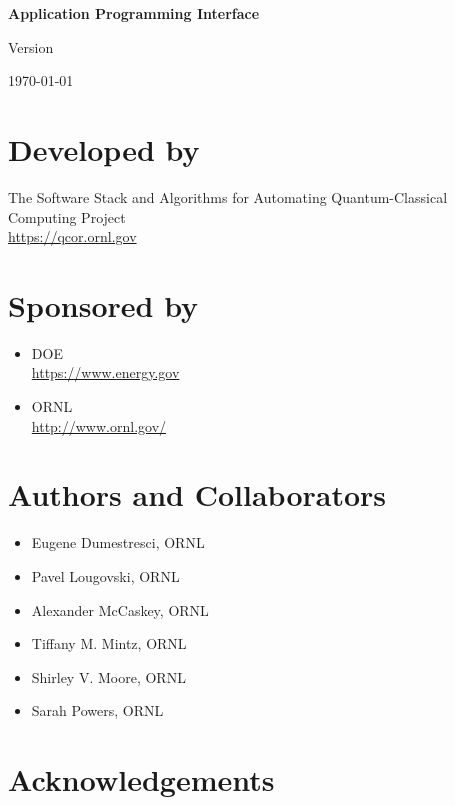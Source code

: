 \thispagestyle{empty}
\begin{center}
\textbf{\Huge \qcor}
\par
\end{center}
\begin{center}
\textbf{\LARGE Application Programming Interface}\\
\par
\end{center}

\begin{center}
Version \insertDocVersion
\par
\end{center}

\vspace{0.5in}
\begin{center}
\today
\end{center}

\vspace{0.5in}

\vfill{}

\section*{Developed by}
The Software Stack and Algorithms for Automating Quantum-Classical Computing Project \\
\url{https://qcor.ornl.gov}
\pagebreak{}

\section*{Sponsored by}
\begin{itemize}
\item \ac{DOE}\\
  \url{https://www.energy.gov}
\item \ac{ORNL}\\
  \url{http://www.ornl.gov/} 
\end{itemize}

\section*{Authors and Collaborators}
\begin{itemize}
\item Eugene Dumestresci, \ac{ORNL}
\item Pavel Lougovski, \ac{ORNL}
\item Alexander McCaskey, \ac{ORNL}
\item Tiffany M. Mintz, \ac{ORNL}
\item Shirley V. Moore, \ac{ORNL}
\item Sarah Powers, \ac{ORNL}
\end{itemize}

\date{\today}

\section*{Acknowledgements}



